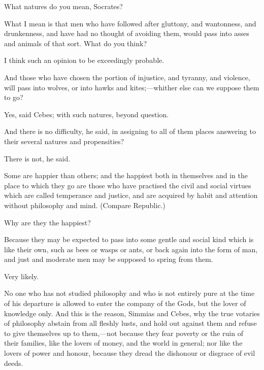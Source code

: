 \documentclass[11pt,letter]{article}
\begin{document}
\par  What natures do you mean, Socrates?

\par  What I mean is that men who have followed after gluttony, and wantonness, and drunkenness, and have had no thought of avoiding them, would pass into asses and animals of that sort. What do you think?

\par  I think such an opinion to be exceedingly probable.

\par  And those who have chosen the portion of injustice, and tyranny, and violence, will pass into wolves, or into hawks and kites;—whither else can we suppose them to go?

\par  Yes, said Cebes; with such natures, beyond question.

\par  And there is no difficulty, he said, in assigning to all of them places answering to their several natures and propensities?

\par  There is not, he said.

\par  Some are happier than others; and the happiest both in themselves and in the place to which they go are those who have practised the civil and social virtues which are called temperance and justice, and are acquired by habit and attention without philosophy and mind. (Compare Republic.)

\par  Why are they the happiest?

\par  Because they may be expected to pass into some gentle and social kind which is like their own, such as bees or wasps or ants, or back again into the form of man, and just and moderate men may be supposed to spring from them.

\par  Very likely.

\par  No one who has not studied philosophy and who is not entirely pure at the time of his departure is allowed to enter the company of the Gods, but the lover of knowledge only. And this is the reason, Simmias and Cebes, why the true votaries of philosophy abstain from all fleshly lusts, and hold out against them and refuse to give themselves up to them,—not because they fear poverty or the ruin of their families, like the lovers of money, and the world in general; nor like the lovers of power and honour, because they dread the dishonour or disgrace of evil deeds.
\end{document}
